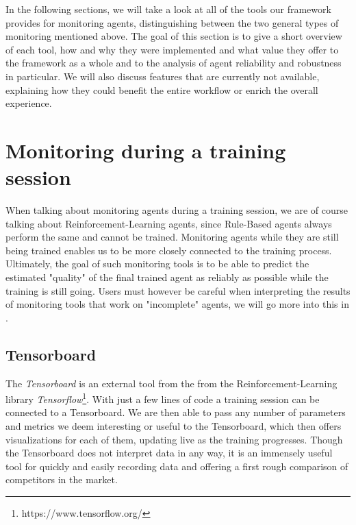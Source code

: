In the following sections, we will take a look at all of the tools our framework provides for monitoring agents, distinguishing between the two general types of monitoring mentioned above. The goal of this section is to give a short overview of each tool, how and why they were implemented and what value they offer to the framework as a whole and to the analysis of agent reliability and robustness in particular. We will also discuss features that are currently not available, explaining how they could benefit the entire workflow or enrich the overall experience.

\section{Monitoring during a training session}

When talking about monitoring agents during a training session, we are of course talking about Reinforcement-Learning agents, since Rule-Based agents always perform the same and cannot be trained.  Monitoring agents while they are still being trained enables us to be more closely connected to the training process. Ultimately, the goal of such monitoring tools is to be able to predict the estimated "quality" of the final trained agent as reliably as possible while the training is still going. Users must however be careful when interpreting the results of monitoring tools that work on "incomplete" agents, we will go more into this  in .

\subsection{Tensorboard}

The \emph{Tensorboard} is an external tool from the from the Reinforcement-Learning library \emph{Tensorflow}\footnote[0][-0.2]{https://www.tensorflow.org/}. With just a few lines of code  a training session can be connected to a Tensorboard. We are then able to pass any number of parameters and metrics we deem interesting or useful to the Tensorboard, which then offers visualizations for each of them, updating live as the training progresses. Though the Tensorboard does not interpret data in any way, it is an immensely useful tool for quickly and easily recording data and offering a first rough comparison of competitors in the market.


